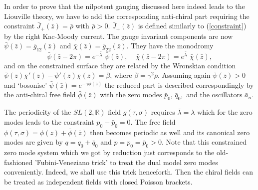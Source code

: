 \documentclass[a4paper,12pt]{article}
\newcommand{\rr}{\mathbb{R}}
\begin{document}
\noindent
In order to prove that the nilpotent gauging discussed here indeed leads
to the Liouville theory, we have to add the corresponding
anti-chiral part requiring the constraint $\bar J_+(\bar z)=\bar\rho$
with $\bar\rho >0$. $\bar J_+(\bar z)$ is defined similarly to
(\ref{constraint}) by the right Kac-Moody current. The gauge invariant
components are now $\bar\psi(\bar z)=\bar g_{12}(\bar z)$ and
$\bar\chi(\bar z)=\bar g_{22}(\bar z)$. They have the
monodromy
\begin{equation}\label{monodromy-psibar}
\bar\psi(\bar z-2\pi)=e^{-\bar\lambda}\,\,\bar\psi(\bar z),~~~~~
\bar\chi(\bar z-2\pi)=e^{\bar\lambda}\,\,\bar\chi(\bar z),
\end{equation}
and on the constrained surface they are related by the Wronskian
condition $\bar\psi(\bar z)\bar\chi'(\bar z)-
\bar\psi'(\bar z)\bar\chi(\bar z)=\bar\beta$, where $\bar\beta
=\gamma^2\bar\rho$. Assuming again $\bar\psi(\bar z)>0$ and `bosonise'
$ \bar\psi(\bar z)=e^{-\gamma\bar\phi(\bar z)}$
the reduced part is described correspondingly by
the anti-chiral free field $\bar\phi(\bar z)$ with the zero modes
$\bar p_0,\, \bar q_0,$  and the oscillators $\bar a_n$.

\noindent
The periodicity of the $SL(2,\rr)$ field $g(\tau, \sigma)$ requires
$\bar\lambda=\lambda$ which for the zero modes leads to the constraint
$p_0-\bar p_0=0$.  The free field $\phi(\tau,\sigma)=\phi(z)+
\bar\phi(\bar z)$ then becomes periodic as well and its canonical zero
modes are given by $q=q_0+\bar q_0$ and $p=p_0=\bar p_0 >0$. Note that this
constrained zero mode system which we got by reduction just corresponds to
the old-fashioned 'Fubini-Veneziano trick' to treat the dual model
zero modes conveniently. Indeed, we shall use this trick henceforth.
Then the chiral fields can be treated as independent fields with
closed Poisson brackets.
\end{document}
